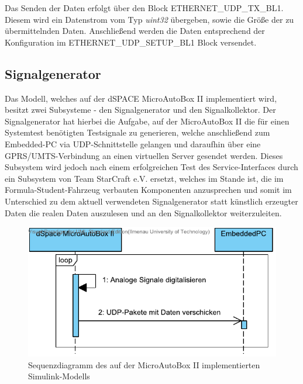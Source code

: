 \documentclass[fontsize = 12pt, paper = a4]{scrreprt}
\begin{document}
\begin{itemize}
Das Senden der Daten erfolgt über den Block ETHERNET\_UDP\_TX\_BL1. Diesem wird ein Datenstrom vom Typ \textit{uint32} übergeben, sowie die Größe der zu übermittelnden Daten. Anschließend werden die Daten entsprechend der Konfiguration im ETHERNET\_UDP\_SETUP\_BL1 Block versendet.



\end{itemize}

\subsection{Signalgenerator}

Das Modell, welches auf der dSPACE MicroAutoBox II implementiert wird, besitzt zwei Subsysteme - den Signalgenerator und den Signalkollektor. Der Signalgenerator hat hierbei die Aufgabe, auf der MicroAutoBox II die für einen Systemtest benötigten Testsignale zu generieren, welche anschließend zum Embedded-PC via UDP-Schnittstelle gelangen und daraufhin über eine GPRS/UMTS-Verbindung an einen virtuellen Server gesendet werden. Dieses Subsystem wird jedoch nach einem erfolgreichen Test des Service-Interfaces durch ein Subsystem von Team StarCraft e.V. ersetzt, welches im Stande ist, die im Formula-Student-Fahrzeug verbauten Komponenten anzusprechen und somit im Unterschied zu dem aktuell verwendeten Signalgenerator statt künstlich erzeugter Daten die realen Daten auszulesen und an den Signalkollektor weiterzuleiten. \vspace*{5mm}

\begin{figure}[h]
\centering
\includegraphics[scale = 1]{opt_autobox}
\caption[Sequenzdiagramm Simulink-Modell]
{Sequenzdiagramm des auf der MicroAutoBox II implementierten Simulink-Modells}
\end{figure}
\end{document}
